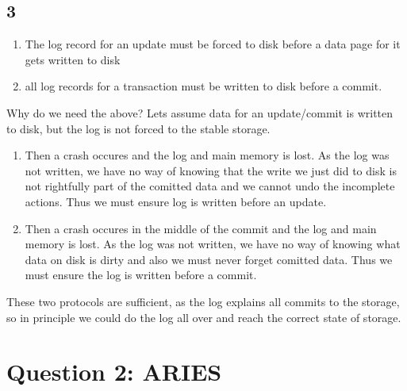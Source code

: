 \documentclass[a4paper, 10pt]{article}
\begin{document}
\subsection*{3}
\begin{enumerate}
    \item The log record for an update must be forced to disk before a data page for it gets written to disk 
    \item all log records for a transaction must be written to disk before a commit.
\end{enumerate}
Why do we need the above?
Lets assume data for an update/commit is written to disk, but the log is not forced to the stable storage.
\begin{enumerate}
    \item Then a crash occures and the log and main memory is lost. As the log was not written, we have no way of knowing that the write we just did to disk is not rightfully part of the comitted data and we cannot undo the incomplete actions. Thus we must ensure log is written before an update.
    \item  Then a crash occures in the middle of the commit and the log and main memory is lost. As the log was not written, we have no way of knowing what data on disk is dirty and also we must never forget comitted data. Thus we must ensure the log is written before a commit.
\end{enumerate}
These two protocols are sufficient, as the log explains all commits to the storage, so in principle we could do the log all over and reach the correct state of storage.

\section*{Question 2: ARIES}
\end{document}
